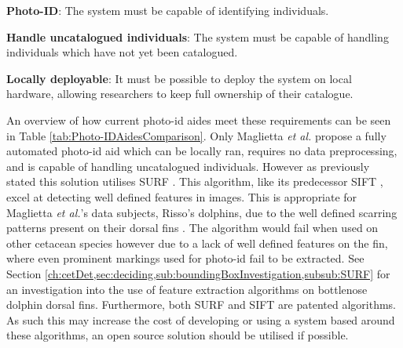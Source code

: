 \textbf{Photo-ID}: The system must be capable of identifying individuals.

\textbf{Handle uncatalogued individuals}: The system must be capable of handling individuals which have not yet been catalogued. 

\textbf{Locally deployable}: It must be possible to deploy the system on local hardware, allowing researchers to keep full ownership of their catalogue.

An overview of how current photo-id aides meet these requirements can be seen in Table \ref{tab:Photo-IDAidesComparison}. Only Maglietta \textit{et al.} propose a fully automated photo-id aid which can be locally ran, requires no data preprocessing, and is capable of handling uncatalogued individuals. However as previously stated this solution utilises SURF \cite{bay_speeded-up_2008}. This algorithm, like its predecessor SIFT \cite{lowe_object_1999}, excel at detecting well defined features in images. This is appropriate for Maglietta \textit{et al.}'s data subjects, Risso's dolphins, due to the well defined scarring patterns present on their dorsal fins \cite{mariani_analysis_2016}. The algorithm would fail when used on other cetacean species however due to a lack of well defined features on the fin, where even prominent markings used for photo-id fail to be extracted. See Section \ref{ch:cetDet,sec:deciding,sub:boundingBoxInvestigation,subsub:SURF} for an investigation into the use of feature extraction algorithms on bottlenose dolphin dorsal fins. Furthermore, both SURF and SIFT are patented algorithms. As such this may increase the cost of developing or using a system based around these algorithms, an open source solution should be utilised if possible.

